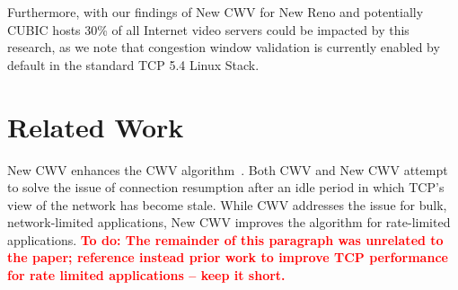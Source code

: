 \documentclass[10pt,sigconf]{acmart}
\newcommand{\todo}[1]{\textbf{\textcolor{red}{To do: #1}}}
\begin{document}
 Furthermore, with our findings of New CWV for New Reno and potentially CUBIC hosts 30\% of all Internet video servers could be impacted by this research, as we note that congestion window validation is currently enabled by default in the standard TCP 5.4 Linux Stack. 


\section{Related Work}
\label{sec:related}

New CWV enhances the CWV algorithm~\cite{rfc2861-2000-padhye-congestion-window-validation}.
Both CWV and New CWV attempt to solve the issue of connection resumption after
an idle period in which TCP's view of the network has become stale. While CWV
addresses the issue for bulk, network-limited applications, New CWV improves
the algorithm for rate-limited applications.
\todo{The remainder of this paragraph was unrelated to the paper; reference
instead prior work to improve TCP performance for rate limited applications --
keep it short.}
\end{document}
